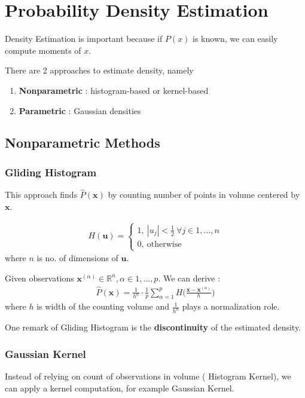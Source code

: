 \chapter{Probability Density Estimation}

Density Estimation is important because if $P(x)$ is known, we can easily compute moments of $x$.

There are 2 approaches to estimate density, namely
\begin{enumerate}
	\item \textbf{Nonparametric} : histogram-based or kernel-based
	\item \textbf{Parametric} : Gaussian densities
\end{enumerate}

\section{Nonparametric Methods}
\subsection{Gliding Histogram}

This approach finds $\hat{P}	(\boldsymbol{x})$ by counting number of points in volume centered by $\boldsymbol{x}$.


\begin{align*}
H(\boldsymbol{u}) = \begin{cases}
	1, \ |u_j| < \frac{1}{2} \ \forall j \in 1,\dots,n  \\
0 ,\ \text{otherwise}
\end{cases}	
\end{align*}
where $n$ is no. of dimensions of $\boldsymbol{u}$.

Given observations $\boldsymbol{x}^{(\alpha)} \in \mathbb{R}^n, \alpha \in 1,\dots, p$.
We can derive : 
\begin{align*}
	\hat{P}(\boldsymbol{x}) = \frac{1}{h^n} \cdot \frac{1}{p} \sum_{\alpha=1}^{p} H\bigg( \frac{\boldsymbol{x} -\boldsymbol{x}^{(\alpha)} }{h} \bigg)
\end{align*}
where $h$ is width of the counting volume and $\frac{1}{h^n}$ plays a normalization role.

One remark of Gliding Histogram is the \textbf{discontinuity} of the estimated density.

\subsection{Gaussian Kernel}
Instead of relying on count of observations in volume ( Histogram Kernel), we can apply a kernel computation, for example Gaussian Kernel.


